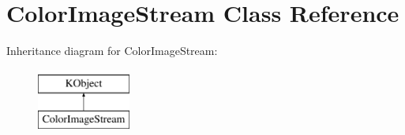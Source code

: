 \hypertarget{class_color_image_stream}{\section{\-Color\-Image\-Stream \-Class \-Reference}
\label{class_color_image_stream}
}
\-Inheritance diagram for \-Color\-Image\-Stream\-:\begin{figure}[H]
\begin{center}
\leavevmode
\includegraphics[height=2.000000cm]{class_color_image_stream}
\end{center}
\end{figure}
